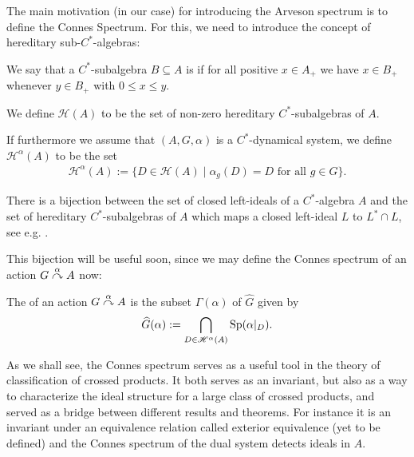 The main motivation (in our case) for introducing the Arveson spectrum is to define the Connes Spectrum. For this, we need to introduce the concept of hereditary sub-$C^*$-algebras:
\begin{definition}
	We say that a $C^*$-subalgebra $B\subseteq A$ is  if for all positive $x \in A_+$ we have $x \in B_+$ whenever $y \in B_+$ with $0 \leq x \leq y$. 
	
	We define $\mathscr{H}(A)$ to be the set of non-zero hereditary $C^*$-subalgebras of $A$. 
	
	If furthermore we assume that $(A, G, \alpha)$ is a $C^*$-dynamical system, we define $\mathscr{H}^\alpha(A)$ to be the set
	\begin{align*}
		\mathscr{H}^\alpha (A) := \{ D \in \mathscr{H}(A) \mid \alpha_g(D)=D \text{ for all } g \in G\}.
	\end{align*}
\end{definition}
\begin{remark}
	There is a bijection between the set of closed left-ideals of a $C^*$-algebra $A$ and the set of hereditary $C^*$-subalgebras of $A$ which maps a closed left-ideal $L$ to $L^* \cap L$, see e.g. \cite[II.5.3.2]{blackadar}.
\end{remark}
This bijection will be useful soon, since we may define the Connes spectrum of an action $G \stackrel{\alpha}{\curvearrowright} A$ now:
\begin{definition}
	The  of an action $G \stackrel{\alpha}{\curvearrowright} A$ is the subset $\Gamma(\alpha)$ of $\hat G$ given by
	\begin{align*}
		\widehat{G} ( \alpha) := \bigcap_{D \in \mathscr{H}^\alpha (A)} \mathrm{Sp}(\alpha|_D).
	\end{align*}
\end{definition}
As we shall see, the Connes spectrum serves as a useful tool in the theory of classification of crossed products. It both serves as an invariant, but also as a way to characterize the ideal structure for a large class of crossed products, and served as a bridge between different results and theorems. For instance it is an invariant under an equivalence relation called exterior equivalence (yet to be defined) and the Connes spectrum of the dual system detects ideals in $A$. 

